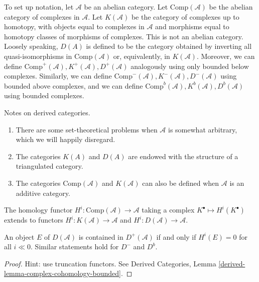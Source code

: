 \noindent
To set up notation, let $\mathcal{A}$ be an abelian category. Let
$\text{Comp}(\mathcal{A})$ be the abelian category of complexes in
$\mathcal{A}$. Let $K(\mathcal{A})$ be the category of complexes up to
homotopy, with objects equal to complexes in $\mathcal{A}$ and morphisms
equal to
homotopy classes of morphisms of complexes. This is not an abelian category.
Loosely speaking, $D(A)$ is defined to be the category obtained by inverting
all quasi-isomorphisms in $\text{Comp}(\mathcal{A})$ or, equivalently, in
$K(\mathcal{A})$. Moreover, we can define $\text{Comp}^+(\mathcal{A}),
K^+(\mathcal{A}), D^+(\mathcal{A})$ analogously using only bounded below
complexes. Similarly, we can define $\text{Comp}^-(\mathcal{A}),
K^-(\mathcal{A}), D^-(\mathcal{A})$ using bounded above complexes, and we can
define $\text{Comp}^b(\mathcal{A}), K^b(\mathcal{A}), D^b(\mathcal{A})$ using
bounded complexes.

\begin{remark}
\label{remarks-derived-categories}
Notes on derived categories.
\begin{enumerate}
\item
There are some set-theoretical problems when $\mathcal{A}$ is somewhat
arbitrary, which we will happily disregard.
\item
The categories $K(A)$ and $D(A)$ are endowed with the structure of a
triangulated category.
\item
The categories $\text{Comp}(\mathcal{A})$ and $K(\mathcal{A})$ can also be
defined when $\mathcal{A}$ is an additive category.
\end{enumerate}
\end{remark}

\noindent
The homology functor $H^i : \text{Comp}(\mathcal{A}) \to \mathcal{A}$ taking a
complex $K^\bullet \mapsto H^i(K^\bullet)$ extends to functors $H^i :
K(\mathcal{A}) \to \mathcal{A}$ and $H^i : D(\mathcal{A}) \to \mathcal{A}$.

\begin{lemma}
\label{lemma-when-in-bounded}
An object $E$ of $D(\mathcal{A})$ is contained in $D^+(\mathcal{A})$ if and
only if $H^i(E) =0 $ for all $i \ll 0$. Similar statements hold for $D^-$ and
$D^b$.
\end{lemma}

\begin{proof}
Hint: use truncation functors. See
Derived Categories, Lemma \ref{derived-lemma-complex-cohomology-bounded}.
\end{proof}

